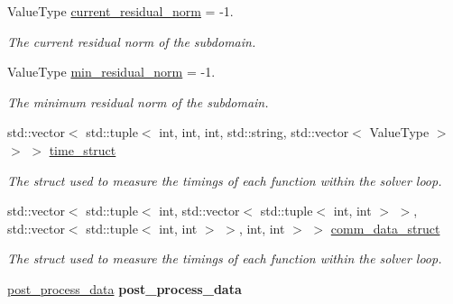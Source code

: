\begin{DoxyCompactItemize}
Value\+Type \hyperlink{structschwz_1_1Metadata_a3436901bfcd4f17f65ed3acb810a7909}{current\+\_\+residual\+\_\+norm} = -\/1.
\begin{DoxyCompactList}\small\item\em The current residual norm of the subdomain. \end{DoxyCompactList}\item 
\mbox{\label{structschwz_1_1Metadata_a04bd75fb60c4085481a3fc3e96269452}} 
Value\+Type \hyperlink{structschwz_1_1Metadata_a04bd75fb60c4085481a3fc3e96269452}{min\+\_\+residual\+\_\+norm} = -\/1.
\begin{DoxyCompactList}\small\item\em The minimum residual norm of the subdomain. \end{DoxyCompactList}\item 
\mbox{\label{structschwz_1_1Metadata_a50bb2b3dc28c0eabbd423a069e560951}} 
std\+::vector$<$ std\+::tuple$<$ int, int, int, std\+::string, std\+::vector$<$ Value\+Type $>$ $>$ $>$ \hyperlink{structschwz_1_1Metadata_a50bb2b3dc28c0eabbd423a069e560951}{time\+\_\+struct}
\begin{DoxyCompactList}\small\item\em The struct used to measure the timings of each function within the solver loop. \end{DoxyCompactList}\item 
\mbox{\label{structschwz_1_1Metadata_a54f774e70eb42b84f63f702262b99fa6}} 
std\+::vector$<$ std\+::tuple$<$ int, std\+::vector$<$ std\+::tuple$<$ int, int $>$ $>$, std\+::vector$<$ std\+::tuple$<$ int, int $>$ $>$, int, int $>$ $>$ \hyperlink{structschwz_1_1Metadata_a54f774e70eb42b84f63f702262b99fa6}{comm\+\_\+data\+\_\+struct}
\begin{DoxyCompactList}\small\item\em The struct used to measure the timings of each function within the solver loop. \end{DoxyCompactList}\item 
\mbox{\label{structschwz_1_1Metadata_abb52c3cb813542a696cb1a9420503bd6}} 
\hyperlink{structschwz_1_1Metadata_1_1post__process__data}{post\+\_\+process\+\_\+data} {\bfseries post\+\_\+process\+\_\+data}
\item 

\end{DoxyCompactItemize}
